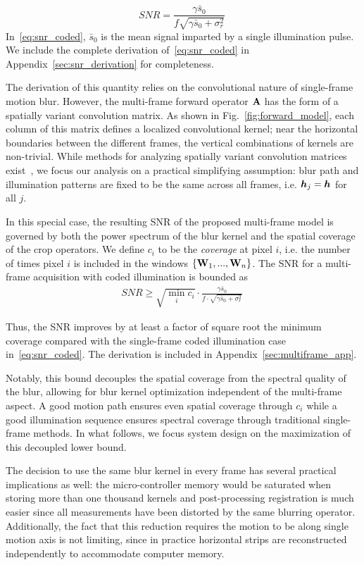 \begin{equation}
    \label{eq:snr_coded}
    SNR  = \frac{\gamma\bar{s}_0}{f\sqrt{\gamma\bar{s}_0 + \sigma^2_{r}}}\:
\end{equation}
In~\eqref{eq:snr_coded}, $\bar{s}_0$ is the mean signal imparted by a single illumination pulse. We include the complete derivation of~\eqref{eq:snr_coded} in Appendix~\ref{sec:snr_derivation} for completeness. 

The derivation of this quantity relies on the convolutional nature of single-frame motion blur. 
However, the multi-frame forward operator $\mathbf{A}$ has the form of a spatially variant convolution matrix. As shown in Fig.~\ref{fig:forward_model},
each column of this matrix defines a localized convolutional kernel; near the horizontal boundaries between the different frames, the vertical combinations of kernels are non-trivial. 
While methods for analyzing spatially variant convolution matrices exist~\cite{chan2011bounds}, we focus our analysis on a practical simplifying assumption: blur path and illumination patterns are fixed to be the same across all frames, i.e. $\bm{h}_j=\bm{h}$ for all $j$.

In this special case, the resulting SNR of the proposed multi-frame model is governed by both the power spectrum of the blur kernel and the spatial coverage of the crop operators. We define $c_i$ to be the \textit{coverage} at pixel $i$, i.e. the number of times pixel $i$ is included in the windows $\{\mathbf{W}_1,...,\mathbf{W}_n\}$.
The SNR for a multi-frame acquisition with coded illumination is bounded as
\begin{align*}
    SNR  \geq \sqrt{
    \min_{i} c_i}  \cdot \frac{ \gamma\bar{s}_0}{f\cdot \sqrt{\gamma\bar{s}_0 + \sigma^2_{r}}}\:
\end{align*}

Thus, the SNR improves by at least a factor of square root the minimum coverage compared with the single-frame coded illumination case in~\eqref{eq:snr_coded}. The derivation is included in Appendix~\ref{sec:multiframe_app}.

Notably, this bound decouples the spatial coverage from the spectral quality of the blur, allowing for blur kernel optimization independent of the multi-frame aspect. A good motion path ensures even spatial coverage through $c_i$ while a good illumination sequence ensures spectral coverage through traditional single-frame methods. In what follows, we focus system design on the maximization of this decoupled lower bound. 

The decision to use the same blur kernel in every frame has several practical implications as well: the micro-controller memory would be saturated when storing more than one thousand kernels and post-processing registration is much easier since all measurements have been distorted by the same blurring operator. Additionally, the fact that this reduction requires the motion to be along single motion axis is not limiting, since in practice horizontal strips are reconstructed independently to accommodate computer memory. 

